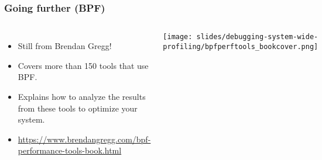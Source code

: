 \begin{frame}[fragile]
  \frametitle{Going further (BPF)}
  \begin{columns}
    \begin{itemize}
    \item Still from Brendan Gregg!
    \item Covers more than 150 tools that use BPF.
    \item Explains how to analyze the results from these tools to optimize
      your system.
    \item \url{https://www.brendangregg.com/bpf-performance-tools-book.html}
    \end{itemize}
    \texttt{[image: slides/debugging-system-wide-profiling/bpfperftools\_bookcover.png]}\\ 
  \end{columns}
\end{frame}
